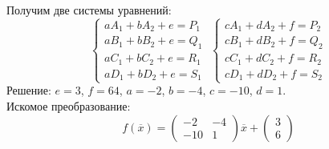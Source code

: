 \documentclass [a4paper,12pt]{article}
\begin{document}
Получим две системы уравнений:
\begin{equation*}
  \begin{cases}
  aA_1 + bA_2 + e = P_1\\
  aB_1 + bB_2 + e = Q_1\\
  aC_1 + bC_2 + e = R_1\\
  aD_1 + bD_2 + e = S_1
  \end{cases}
  \;
  \begin{cases}
  cA_1 + dA_2 + f = P_2\\
  cB_1 + dB_2 + f = Q_2\\
  cC_1 + dC_2 + f = R_2\\
  cD_1 + dD_2 + f = S_2
  \end{cases}
\end{equation*}
Решение: $e=3$, $f=64$, $a= -2$, $b=-4$, $c=-10$, $d=1$.\\
Искомое преобразование:\\
\begin{equation*}
f({\overline{x}})=\begin{pmatrix}
-2 & -4\\
-10 & 1
\end{pmatrix}{\overline{x}} +
\begin{pmatrix}
3\\
6
\end{pmatrix}
\end{equation*}
%
\end{document}
